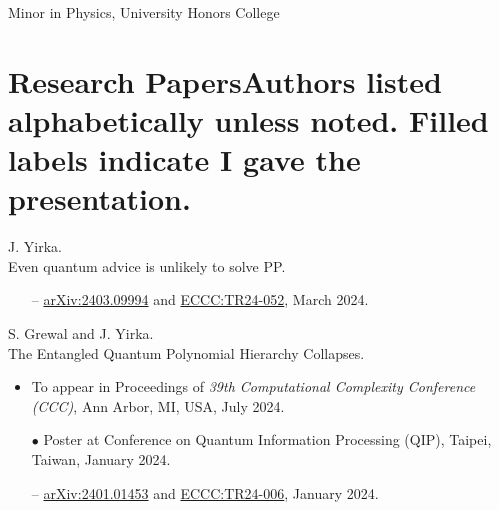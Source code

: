 \documentclass[11pt,letterpaper,serif]{moderncv}
\newcommand{\pubItemSep}{0em}
\begin{document}
\vspace{-\parsep}
{%
}
{
	\begin{adjustwidth}{.25in}{}
		Minor in Physics, University Honors College
	\end{adjustwidth}
}

\section{Research Papers\hfill{\footnotesize \normalfont Authors listed alphabetically unless noted. Filled labels indicate I gave the presentation.}}

J. Yirka.
\\Even quantum advice is unlikely to solve \textup{PP}.
\begin{adjustwidth}{.1in}{}
	\begin{itemize}[itemsep=\pubItemSep]
		\item[--] \href{https://arxiv.org/abs/2403.09994}{arXiv:2403.09994} and \href{https://eccc.weizmann.ac.il/report/2024/052/}{ECCC:TR24-052}, March 2024.
	\end{itemize}
\end{adjustwidth}
\vspace{\parsep}

S. Grewal and J. Yirka.
\\The Entangled Quantum Polynomial Hierarchy Collapses.
\begin{adjustwidth}{.1in}{}
	\begin{itemize}[itemsep=\pubItemSep]
		\item To appear in Proceedings of \textit{39th Computational Complexity Conference (CCC)}, Ann Arbor, MI, USA, July 2024.
		\item[$\bullet$] Poster at Conference on Quantum Information Processing (QIP), Taipei, Taiwan, January 2024.
		\item[--] \href{https://arxiv.org/abs/2401.01453}{arXiv:2401.01453} and \href{https://eccc.weizmann.ac.il/report/2024/006/}{ECCC:TR24-006}, January 2024.
	\end{itemize}
\end{adjustwidth}
\vspace{\parsep}
\end{document}
